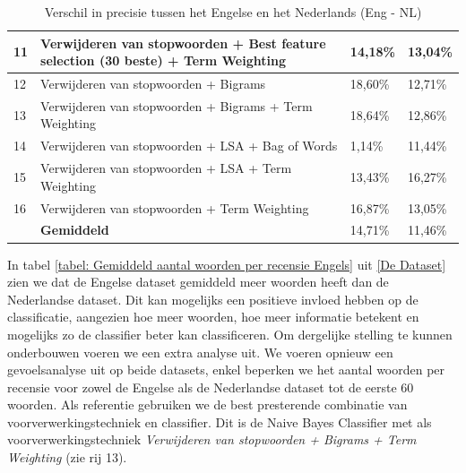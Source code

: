 \begin{table}[h]
\begin{adjustbox}{width=1\textwidth}
\begin{tabular}{|l|l|l|l|}
11       & Verwijderen van stopwoorden + Best feature selection (30 beste) + Term Weighting & 14,18\%                                & 13,04\%                                  \\ \hline
12       & Verwijderen van stopwoorden + Bigrams                                            & 18,60\%                                & 12,71\%                                  \\ \hline
13       & Verwijderen van stopwoorden + Bigrams + Term Weighting                           & 18,64\%                                & 12,86\%                                  \\ \hline
14       & Verwijderen van stopwoorden + LSA + Bag of Words                                 & 1,14\%                                 & 11,44\%                                  \\ \hline
15       & Verwijderen van stopwoorden + LSA + Term Weighting                               & 13,43\%                                & 16,27\%                                  \\ \hline
16       & Verwijderen van stopwoorden + Term Weighting                                     & 16,87\%                                & 13,05\%                                  \\ \hline
         & {\bf Gemiddeld}                                                                  & 14,71\%                                & 11,46\%                                  \\ \hline
\end{tabular}
\end{adjustbox}
\caption{Verschil in precisie tussen het Engelse en het Nederlands (Eng - NL)}
\label{tabel: verschil engels en nederlandse prestatie}
\end{table}

In tabel \ref{tabel: Gemiddeld aantal woorden per recensie Engels} uit \ref{De Dataset} zien we dat de Engelse dataset gemiddeld meer woorden heeft dan de Nederlandse dataset. Dit kan mogelijks een positieve invloed hebben op de classificatie, aangezien hoe meer woorden, hoe meer informatie betekent en mogelijks zo de classifier beter kan classificeren. Om dergelijke stelling te kunnen onderbouwen voeren we een extra analyse uit. We voeren opnieuw een gevoelsanalyse uit op beide datasets, enkel beperken we het aantal woorden per recensie voor zowel de Engelse als de Nederlandse dataset tot de eerste 60 woorden. Als referentie gebruiken we de best presterende combinatie van voorverwerkingstechniek en classifier. Dit is de Naive Bayes Classifier met als voorverwerkingstechniek \textit{Verwijderen van stopwoorden + Bigrams + Term Weighting} (zie rij 13).\\

